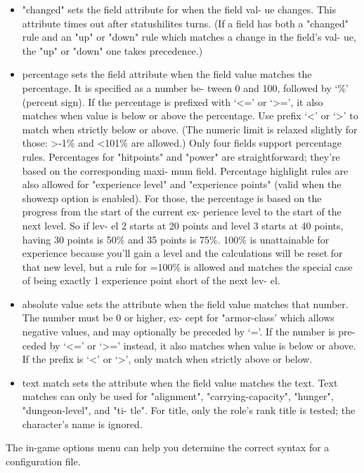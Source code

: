 \documentclass[11pt]{article}
\begin{document}
\begin{itemize}
\item "changed" sets the field attribute for when the field val-
ue changes. This attribute times out after statushilites
turns.  (If a field has both a "changed" rule and an "up"
or "down" rule which matches a change in the field's val-
ue, the "up" or "down" one takes precedence.)

\item percentage sets the field attribute when the field value
matches the percentage. It is specified as a number be-
tween 0 and 100, followed by `\%' (percent sign). If the
percentage is prefixed with `<=' or `>=', it also matches
when value is below or above the percentage. Use prefix
`<' or `>' to match when strictly below or above.  (The
numeric limit is relaxed slightly for those: >-1\% and
<101\% are allowed.) Only four fields support percentage
rules.  Percentages for "hitpoints" and "power" are
straightforward; they're based on the corresponding maxi-
mum field.  Percentage highlight rules are also allowed
for "experience level" and "experience points" (valid when
the showexp option is enabled). For those, the percentage
is based on the progress from the start of the current ex-
perience level to the start of the next level. So if lev-
el 2 starts at 20 points and level 3 starts at 40 points,
having 30 points is 50\% and 35 points is 75\%. 100\% is
unattainable for experience because you'll gain a level
and the calculations will be reset for that new level, but
a rule for =100\% is allowed and matches the special case
of being exactly 1 experience point short of the next lev-
el.

\item absolute value sets the attribute when the field value
matches that number. The number must be 0 or higher, ex-
cept for "armor-class' which allows negative values, and
may optionally be preceded by `='. If the number is pre-
ceded by `<=' or `>=' instead, it also matches when value
is below or above.  If the prefix is `<' or `>', only
match when strictly above or below.

\item text match sets the attribute when the field value matches
the text. Text matches can only be used for "alignment",
"carrying-capacity", "hunger", "dungeon-level", and "ti-
tle".  For title, only the role's rank title is tested;
the character's name is ignored.
\end{itemize}

   The in-game options menu can help you determine the correct
syntax for a configuration file.
\end{document}
